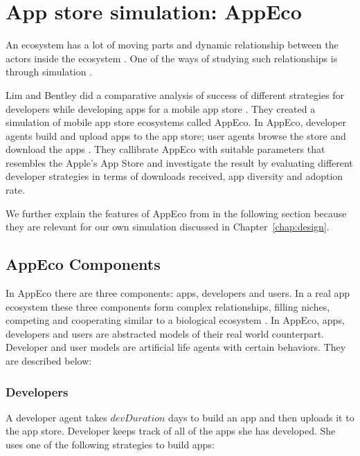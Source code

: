 \section{App store simulation: AppEco}
\label{sec:analysis_appeco}

An ecosystem has a lot of moving parts and dynamic relationship between the actors inside the ecosystem \cite{Jansen}. One of the ways of studying such relationships is through simulation \cite{castiglione2006agent}.

Lim and Bentley did a comparative analysis of success of different strategies for developers while developing apps for a mobile app store \cite{lim2012successful}. They created a simulation of mobile app store ecosystems called AppEco. In AppEco, developer agents build and upload apps to the app store; user agents browse the store and download the apps \cite{lim2012successful}. They callibrate AppEco with suitable parameters that resembles the Apple's App Store and investigate the result by evaluating different developer strategies in terms of downloads received, app diversity and adoption rate.

We further explain the features of AppEco from \cite{lim2012successful} in the following section because they are relevant for our own simulation discussed in Chapter~\ref{chap:design}.

\subsection{AppEco Components}

In AppEco there are three components: apps, developers and users. In a real app ecosystem these three components form complex relationships, filling niches, competing and cooperating similar to a biological ecosystem \cite{lin2009operating}. In AppEco, apps, developers and users are abstracted models of their real world counterpart. Developer and user models are artificial life agents with certain behaviors. They are described below:

\subsubsection*{Developers}
\label{subsubsec:appeco_components_developers}

A developer agent takes $devDuration$ days to build an app and then uploads it to the app store. Developer keeps track of all of the apps she has developed. She uses one of the following strategies to build apps:

